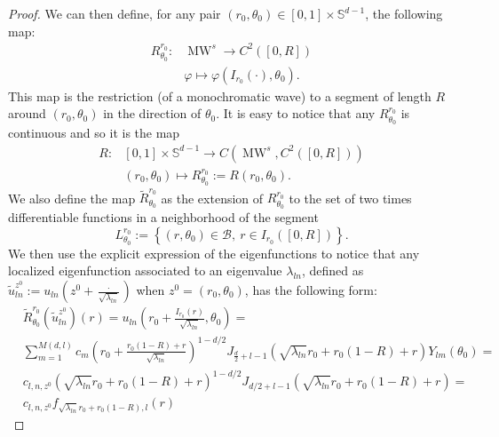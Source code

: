 \documentclass{amsart}
\theoremstyle{definition}
\theoremstyle{remark}
\numberwithin{equation}{section}
\theoremstyle{definition}
\theoremstyle{remark}
\DeclareMathOperator\MW{MW}
\begin{document}
\begin{proof}
   We can then define, for any pair $\left(r_0,\theta_0\right)\in[0,1]\times\mathbb{S}^{d-1}$, the following  map: \begin{equation}
       \begin{aligned}
           R_{\theta_0}^{r_0}:&\MW^s\rightarrow C^2\left([0,R]\right)\\&\varphi\mapsto\varphi\left(I_{r_0}\left(\cdot\right),\theta_0\right).
       \end{aligned}
   \end{equation}This map is the restriction (of a monochromatic wave) to a segment of length $R$ around $\left(r_0,\theta_0\right)$ in the direction of $\theta_0$. It is easy to notice that any $  R_{\theta_0}^{r_0}$ is continuous and so it is the map \begin{equation}
       \begin{aligned}
           R:&[0,1]\times\mathbb{S}^{d-1}\rightarrow C\left(\MW^s,C^2\left([0,R]\right)\right)\\&\left(r_0,\theta_0\right)\mapsto R_{\theta_0}^{r_0}:=R(r_0,\theta_0).
       \end{aligned}
   \end{equation}
We also define the map  $\tilde{R}_{\theta_0}^{r_0}$ as the extension of $R_{\theta_0}^{r_0}$ to the set of two times differentiable functions in a neighborhood of the segment \begin{equation}L_{\theta_0}^{r_0}:=\left\{(r,\theta_0)\in\mathcal{B},\ r\in I_{r_0}([0,R])\right\}.\end{equation} We then use the explicit expression of the eigenfunctions to notice that any localized eigenfunction associated to an eigenvalue $\lambda_{ln}$, defined as $\tilde{u}_{ln}^{z^0}:=u_{ln}\left(z^0+\frac{\cdot}{\sqrt{\lambda_{ln}}}\right)$ when $z^0=\left(r_0,\theta_0\right)$, has the following form: \begin{equation}
		\begin{aligned}
			& \tilde{R}_{\theta_0}^{r_0}\left(\tilde{u}_{ln}^{z^0}\right)(r)=u_{ln}\left(r_0+\frac{I_{r_0}(r) }{\sqrt{\lambda_{ln}}},\theta_0\right)=\\&\sum_{m=1}^{M(d,l)}c_m\left(r_0+\frac{r_0\left(1-R\right)+r}{\sqrt{\lambda_{ln}}}\right)^{1-d/2}J_{\frac{d}{2}+l-1}\left(\sqrt{\lambda_{ln}}r_0+r_0\left(1-R\right)+r\right)Y_{lm}\left(\theta_0\right)=\\&c_{l,n,z^0}\left(\sqrt{\lambda_{ln}}r_0+r_0\left(1-R\right)+r\right)^{1-d/2}J_{d/2+l-1}\left(\sqrt{\lambda_{ln}}r_0+r_0\left(1-R\right)+r\right)=\\&c_{l,n,z^0}f_{\sqrt{\lambda_{ln}}r_0+r_0\left(1-R\right),l}(r)

\end{aligned}
\end{equation}
\end{proof}
\end{document}

